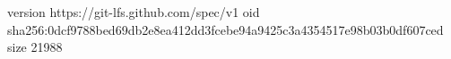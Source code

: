 version https://git-lfs.github.com/spec/v1
oid sha256:0dcf9788bed69db2e8ea412dd3fcebe94a9425c3a4354517e98b03b0df607ced
size 21988
